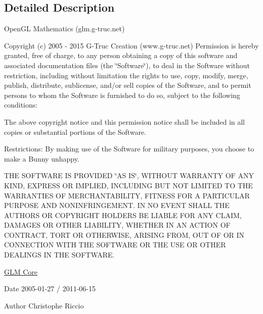 \subsection{Detailed Description}
Open\-G\-L Mathematics (glm.\-g-\/truc.\-net)

Copyright (c) 2005 -\/ 2015 G-\/\-Truc Creation (www.\-g-\/truc.\-net) Permission is hereby granted, free of charge, to any person obtaining a copy of this software and associated documentation files (the \char`\"{}\-Software\char`\"{}), to deal in the Software without restriction, including without limitation the rights to use, copy, modify, merge, publish, distribute, sublicense, and/or sell copies of the Software, and to permit persons to whom the Software is furnished to do so, subject to the following conditions\-:

The above copyright notice and this permission notice shall be included in all copies or substantial portions of the Software.

Restrictions\-: By making use of the Software for military purposes, you choose to make a Bunny unhappy.

T\-H\-E S\-O\-F\-T\-W\-A\-R\-E I\-S P\-R\-O\-V\-I\-D\-E\-D \char`\"{}\-A\-S I\-S\char`\"{}, W\-I\-T\-H\-O\-U\-T W\-A\-R\-R\-A\-N\-T\-Y O\-F A\-N\-Y K\-I\-N\-D, E\-X\-P\-R\-E\-S\-S O\-R I\-M\-P\-L\-I\-E\-D, I\-N\-C\-L\-U\-D\-I\-N\-G B\-U\-T N\-O\-T L\-I\-M\-I\-T\-E\-D T\-O T\-H\-E W\-A\-R\-R\-A\-N\-T\-I\-E\-S O\-F M\-E\-R\-C\-H\-A\-N\-T\-A\-B\-I\-L\-I\-T\-Y, F\-I\-T\-N\-E\-S\-S F\-O\-R A P\-A\-R\-T\-I\-C\-U\-L\-A\-R P\-U\-R\-P\-O\-S\-E A\-N\-D N\-O\-N\-I\-N\-F\-R\-I\-N\-G\-E\-M\-E\-N\-T. I\-N N\-O E\-V\-E\-N\-T S\-H\-A\-L\-L T\-H\-E A\-U\-T\-H\-O\-R\-S O\-R C\-O\-P\-Y\-R\-I\-G\-H\-T H\-O\-L\-D\-E\-R\-S B\-E L\-I\-A\-B\-L\-E F\-O\-R A\-N\-Y C\-L\-A\-I\-M, D\-A\-M\-A\-G\-E\-S O\-R O\-T\-H\-E\-R L\-I\-A\-B\-I\-L\-I\-T\-Y, W\-H\-E\-T\-H\-E\-R I\-N A\-N A\-C\-T\-I\-O\-N O\-F C\-O\-N\-T\-R\-A\-C\-T, T\-O\-R\-T O\-R O\-T\-H\-E\-R\-W\-I\-S\-E, A\-R\-I\-S\-I\-N\-G F\-R\-O\-M, O\-U\-T O\-F O\-R I\-N C\-O\-N\-N\-E\-C\-T\-I\-O\-N W\-I\-T\-H T\-H\-E S\-O\-F\-T\-W\-A\-R\-E O\-R T\-H\-E U\-S\-E O\-R O\-T\-H\-E\-R D\-E\-A\-L\-I\-N\-G\-S I\-N T\-H\-E S\-O\-F\-T\-W\-A\-R\-E.

\hyperlink{group__core}{G\-L\-M Core}

\begin{DoxyDate}{Date}
2005-\/01-\/27 / 2011-\/06-\/15 
\end{DoxyDate}
\begin{DoxyAuthor}{Author}
Christophe Riccio 
\end{DoxyAuthor}
